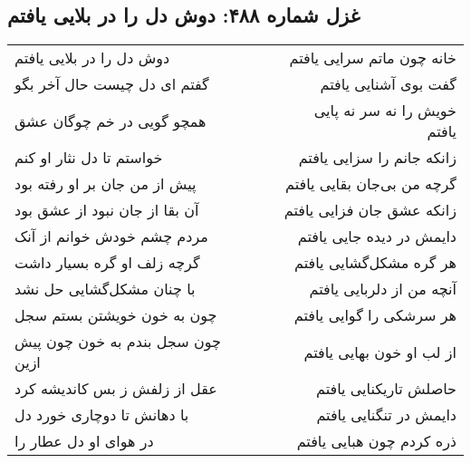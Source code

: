\begin{center}
\section*{غزل شماره ۴۸۸: دوش دل را در بلایی یافتم}
\label{sec:488}
\begin{longtable}{l p{0.5cm} r}
دوش دل را در بلایی یافتم
&&
خانه چون ماتم سرایی یافتم
\\
گفتم ای دل چیست حال آخر بگو
&&
گفت بوی آشنایی یافتم
\\
همچو گویی در خم چوگان عشق
&&
خویش را نه سر نه پایی یافتم
\\
خواستم تا دل نثار او کنم
&&
زانکه جانم را سزایی یافتم
\\
پیش از من جان بر او رفته بود
&&
گرچه من بی‌جان بقایی یافتم
\\
آن بقا از جان نبود از عشق بود
&&
زانکه عشق جان فزایی یافتم
\\
مردم چشم خودش خوانم از آنک
&&
دایمش در دیده جایی یافتم
\\
گرچه زلف او گره بسیار داشت
&&
هر گره مشکل‌گشایی یافتم
\\
با چنان مشکل‌گشایی حل نشد
&&
آنچه من از دلربایی یافتم
\\
چون به خون خویشتن بستم سجل
&&
هر سرشکی را گوایی یافتم
\\
چون سجل بندم به خون چون پیش ازین
&&
از لب او خون بهایی یافتم
\\
عقل از زلفش ز بس کاندیشه کرد
&&
حاصلش تاریکنایی یافتم
\\
با دهانش تا دوچاری خورد دل
&&
دایمش در تنگنایی یافتم
\\
در هوای او دل عطار را
&&
ذره کردم چون هبایی یافتم
\\
\end{longtable}
\end{center}
